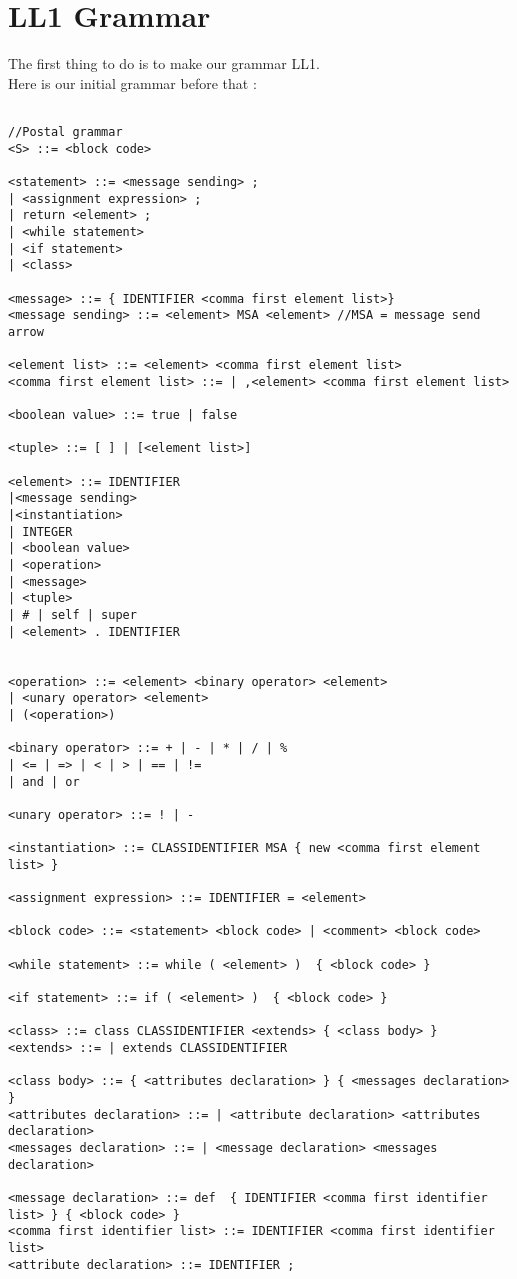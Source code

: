 \documentclass{eplDoc}
\begin{document}
\maketitle
\newpage

\section{LL1 Grammar}
The first thing to do is to make our grammar LL1. \\
Here is our initial grammar before that : 
\begin{lstlisting}
    
//Postal grammar
<S> ::= <block code>

<statement> ::= <message sending> ;
| <assignment expression> ;
| return <element> ;
| <while statement>
| <if statement>
| <class>

<message> ::= { IDENTIFIER <comma first element list>}
<message sending> ::= <element> MSA <element> //MSA = message send arrow

<element list> ::= <element> <comma first element list>
<comma first element list> ::= | ,<element> <comma first element list>

<boolean value> ::= true | false

<tuple> ::= [ ] | [<element list>]
    
<element> ::= IDENTIFIER
|<message sending>
|<instantiation>
| INTEGER
| <boolean value>
| <operation>
| <message>
| <tuple>
| # | self | super
| <element> . IDENTIFIER


<operation> ::= <element> <binary operator> <element>
| <unary operator> <element>
| (<operation>)

<binary operator> ::= + | - | * | / | % 
| <= | => | < | > | == | != 
| and | or

<unary operator> ::= ! | - 

<instantiation> ::= CLASSIDENTIFIER MSA { new <comma first element list> }

<assignment expression> ::= IDENTIFIER = <element>

<block code> ::= <statement> <block code> | <comment> <block code>

<while statement> ::= while ( <element> )  { <block code> }

<if statement> ::= if ( <element> )  { <block code> }

<class> ::= class CLASSIDENTIFIER <extends> { <class body> }
<extends> ::= | extends CLASSIDENTIFIER

<class body> ::= { <attributes declaration> } { <messages declaration> }
<attributes declaration> ::= | <attribute declaration> <attributes declaration>
<messages declaration> ::= | <message declaration> <messages declaration>

<message declaration> ::= def  { IDENTIFIER <comma first identifier list> } { <block code> }
<comma first identifier list> ::= IDENTIFIER <comma first identifier list>
<attribute declaration> ::= IDENTIFIER ;
\end{lstlisting}
\end{document}
